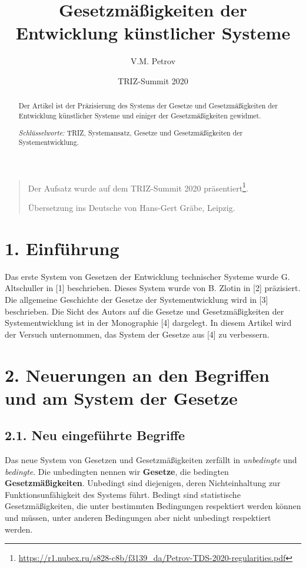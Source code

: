 \documentclass[11pt,a4paper]{article}
\title{Gesetzmäßigkeiten der Entwicklung künstlicher Systeme}
\author{V.M. Petrov}
\date{TRIZ-Summit 2020}
\begin{document}
\maketitle

\begin{quote}
  Der Aufsatz wurde auf dem TRIZ-Summit 2020
  präsentiert\footnote{\url{https://r1.nubex.ru/s828-c8b/f3139_da/Petrov-TDS-2020-regularities.pdf}}.  

  Übersetzung ins Deutsche von Hans-Gert Gräbe, Leipzig.
\end{quote}

\begin{abstract}
  Der Artikel ist der Präzisierung des Systems der Gesetze und
  Gesetzmäßigkeiten der Entwicklung künstlicher Systeme und einiger
  der Gesetzmäßigkeiten gewidmet.

  \emph{Schlüsselworte:} TRIZ, Systemansatz, Gesetze und Gesetzmäßigkeiten
  der Systementwicklung.
\end{abstract}

\section{1. Einführung}
Das erste System von Gesetzen der Entwicklung technischer Systeme wurde
G. Altschuller in [1] beschrieben. Dieses System wurde von B. Zlotin in [2]
präzisiert.  Die allgemeine Geschichte der Gesetze der Systementwicklung wird
in [3] beschrieben.  Die Sicht des Autors auf die Gesetze und
Gesetzmäßigkeiten der Systementwicklung ist in der Monographie [4] dargelegt.
In diesem Artikel wird der Versuch unternommen, das System der Gesetze aus [4]
zu verbessern.

\section{2. Neuerungen an den Begriffen und am System der Gesetze}

\subsection{2.1. Neu eingeführte Begriffe}

Das neue System von Gesetzen und Gesetzmäßigkeiten zerfällt in
\emph{unbedingte} und \emph{bedingte}. Die unbedingten nennen wir
\textbf{Gesetze}, die bedingten \textbf{Gesetzmäßigkeiten}.  Unbedingt sind
diejenigen, deren Nichteinhaltung zur Funktionsunfähigkeit des Systems führt.
Bedingt sind statistische Gesetzmäßigkeiten, die unter bestimmten Bedingungen
respektiert werden können und müssen, unter anderen Bedingungen aber nicht
unbedingt respektiert werden.
\end{document}
